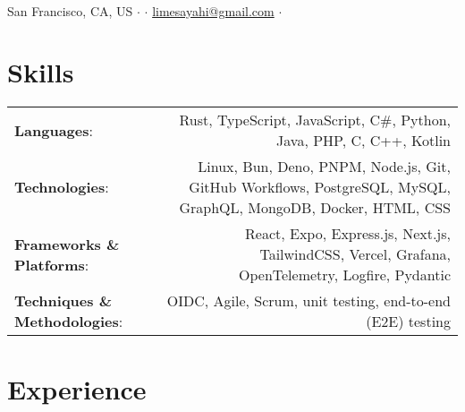 \documentclass[letterpaper,10pt]{article} %
\begin{document}
\pagestyle{empty}
\par
{\\
\footnotesize{
San Francisco, CA, US
$\cdot$
\href{tel:+1-513-484-0972}{\color{black}{(513) 484-0972}}
$\cdot$
\href{mailto:limesayahi@gmail.com}{\color{black}limesayahi@gmail.com}
$\cdot$
\href{https://github.com/emmyoh}{\color{black}\faGithub}
\href{https://www.linkedin.com/in/emil-sayahi}{\color{black}\faLinkedin}\\
}}

\footnotesize{\textbf{\color{summarycolour}{Systems programmer \& web developer, obsessed with product engineering, with experience in startups \& commercial open-source software. Interested in making reliable, scalable, memory-safe software that people want.}}}

\section{Skills}
\scriptsize{
\begin{tabular*}{\linewidth}{@{\extracolsep{\fill}} lr }
\textbf{Languages}: & Rust, TypeScript, JavaScript, C\#, Python, Java, PHP, C, C++, Kotlin\\
\textbf{Technologies}: & Linux, Bun, Deno, PNPM, Node.js, Git, GitHub Workflows, PostgreSQL, MySQL, GraphQL, MongoDB, Docker, HTML, CSS\\
\textbf{Frameworks \& Platforms}: & React, Expo, Express.js, Next.js, TailwindCSS, Vercel, Grafana, OpenTelemetry, Logfire, Pydantic\\
\textbf{Techniques \& Methodologies}: & OIDC, Agile, Scrum, unit testing, end-to-end (E2E) testing
\end{tabular*}}

\section{Experience}
\end{document}

